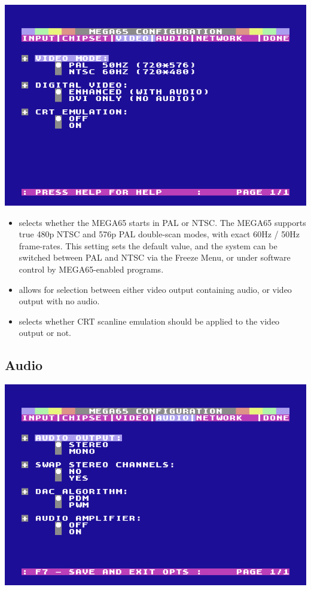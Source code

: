 \begin{center}
\includegraphics[width=0.7\linewidth]{images/ss-m65config-3.png}
\end{center}
\begin{itemize}
  \item {} selects whether the MEGA65 starts in PAL or NTSC.    The MEGA65 supports true 480p NTSC and 576p PAL double-scan modes, with exact 60Hz / 50Hz frame-rates. This setting sets the default value, and the system can be switched between PAL and NTSC via the Freeze Menu, or under software control by MEGA65-enabled programs.
  \item {} allows for selection between either  video output containing audio, or  video output with no audio.
  \item {} selects whether CRT scanline emulation should be applied to the video output or not.
\end{itemize}

\subsection{Audio}

\begin{center}
\includegraphics[width=0.7\linewidth]{images/ss-m65config-4.png}
\end{center}

